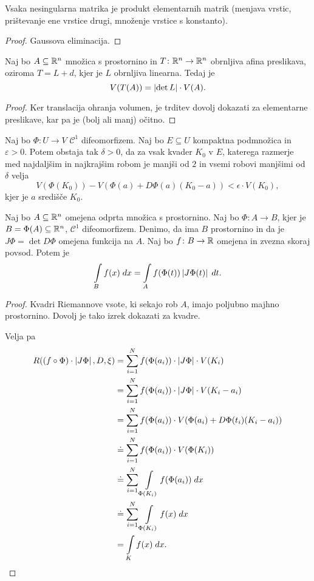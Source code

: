 \begin{lema}
Vsaka nesingularna matrika je produkt elementarnih matrik (menjava
vrstic, prištevanje ene vrstice drugi, množenje vrstice s
konstanto).
\end{lema}

\begin{proof}
Gaussova eliminacija.
\end{proof}

\begin{trditev}
Naj bo $A \subseteq \mathbb{R}^n$ množica s prostornino in
$T \colon \mathbb{R}^n \to \mathbb{R}^n$ obrnljiva afina preslikava, oziroma
$T = L + d$, kjer je $L$ obrnljiva linearna. Tedaj je
\[
V(T(A)) = \left\lvert \det L\right\rvert \cdot V(A).
\]
\end{trditev}

\begin{proof}
Ker translacija ohranja volumen, je trditev dovolj dokazati za
elementarne preslikave, kar pa je (bolj ali manj) očitno.
\end{proof}


\begin{trditev}
Naj bo $\Phi \colon U \to V$ $\mathcal{C}^1$ difeomorfizem. Naj bo
$E \subseteq U$ kompaktna podmnožica in $\varepsilon > 0$. Potem
obstaja tak $\delta > 0$, da za vsak kvader $K_0$ v $E$, katerega
razmerje med najdaljšim in najkrajšim robom je manjši od $2$ in
vsemi robovi manjšimi od $\delta$ velja
\[
V(\Phi(K_0)) - V(\Phi(a)+D\Phi(a)(K_0-a)) < \epsilon \cdot V(K_0),
\]
kjer je $a$ središče $K_0$.
\end{trditev}

\begin{izrek}
Naj bo $A \subseteq \mathbb{R}^n$ omejena odprta množica s prostornino. Naj
bo $\Phi \colon A \to B$, kjer je $B = \Phi(A) \subseteq \mathbb{R}^n$,
$\mathcal{C}^1$ difeomorfizem. Denimo, da ima $B$ prostornino in da
je $J\Phi = \det D\Phi$ omejena funkcija na $A$. Naj bo
$f \colon B \to \mathbb{R}$ omejena in zvezna skoraj povsod. Potem je
\[
\int\limits_B f(x)\;dx = \int\limits_A f(\Phi(t)) \left\lvert J\Phi(t)\right\rvert\;dt.
\]
\end{izrek}

\begin{proof}
Kvadri Riemannove vsote, ki sekajo rob $A$, imajo poljubno majhno
prostornino. Dovolj je tako izrek dokazati za kvadre.

Velja pa
\begin{align*}
R((f \circ \Phi) \cdot \left\lvert J\Phi\right\rvert,D,\xi) &=
\sum_{i=1}^N f(\Phi(a_i)) \cdot \left\lvert J\Phi\right\rvert \cdot V(K_i)
\\
&=
\sum_{i=1}^N f(\Phi(a_i)) \cdot \left\lvert J\Phi\right\rvert \cdot V(K_i - a_i)
\\
&=
\sum_{i=1}^N f(\Phi(a_i)) \cdot V(\Phi(a_i)+D\Phi(t_i)(K_i-a_i))
\\
&\doteq \sum_{i=1}^N f(\Phi(a_i)) \cdot V(\Phi(K_i))
\\
&\doteq \sum_{i=1}^N \int\limits_{\Phi(K_i)} f(\Phi(a_i))\;dx
\\
&\doteq \sum_{i=1}^N \int\limits_{\Phi(K_i)} f(x)\;dx
\\
&= \int\limits_K f(x)\;dx.
\qedhere
\end{align*}
\end{proof}

